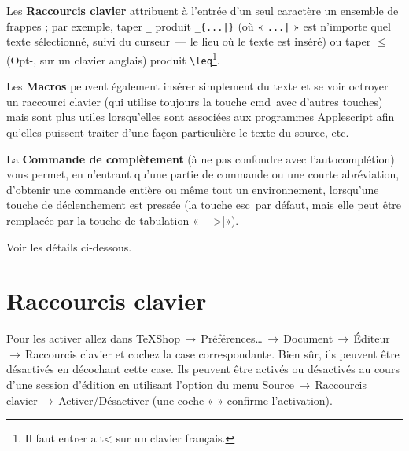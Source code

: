 \documentclass[11pt,french]{article}
\newcommand{\optkey}{\textsf{alt}}
\newcommand{\cmdkey}{\textsf{cmd}}
\newcommand{\esckey}{\textsf{esc}}
\newcommand{\tabkey}{---\kern-5pt>|}
\newcommand{\mnu}[1]{\textsf{#1}}
\newcommand{\cmd}[1]{\textsf{#1}}
\newcommand{\To}{\,\(\to\)\,}
\begin{document}
Les \textbf{\cmd{Raccourcis clavier}} attribuent à l'entrée d'un seul caractère un ensemble de frappes ; par exemple, taper \verb+_+ produit \verb+_{...|}+ (où « \verb+...|+ » est n'importe quel texte sélectionné, suivi du curseur~--- le lieu où le texte est inséré) ou taper \(\leq\) (\cmd{Opt-,} sur un clavier anglais) produit \verb+\leq+\footnote{Il faut entrer \optkey< sur un clavier français.}.

Les \textbf{\cmd{Macros}} peuvent également insérer simplement du texte et se voir octroyer un raccourci clavier (qui utilise toujours la touche \cmdkey\ avec d'autres touches) mais sont plus utiles lorsqu'elles sont associées aux programmes Applescript afin qu'elles puissent traiter d'une façon particulière le texte du source, etc.

La \textbf{\cmd{Commande de complètement}} (à ne pas confondre avec l'\cmd{autocomplétion}\setcounter{footnote}{0}\footnotemark) vous permet, en n'entrant qu'une partie de commande ou une courte abréviation, d'obtenir une commande entière ou même tout un environnement, lorsqu'une touche de déclenchement est pressée (la touche \esckey\ par défaut, mais elle peut être remplacée par la touche de tabulation « \tabkey »).

Voir les détails ci-dessous.

\section{\cmd{Raccourcis clavier}}

%

Pour les activer allez dans \mnu{TeXShop}\To\mnu{Préférences…}\To\mnu{Document}\To\mnu{Éditeur}\To \mnu{Raccourcis clavier} et cochez la case correspondante. Bien sûr, ils peuvent être désactivés en décochant cette case. Ils peuvent être activés ou désactivés au cours d'une session d'édition en utilisant l'option du menu \mnu{Source}\To\mnu{Raccourcis clavier}\To\mnu{Activer/Désactiver} (une coche « \checkmark » confirme l'activation).
\end{document}
